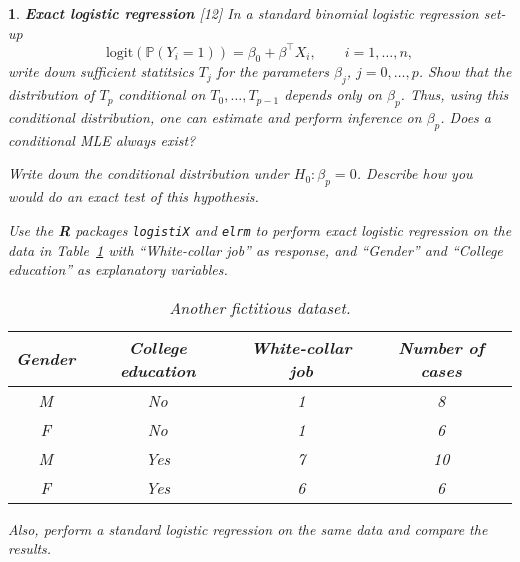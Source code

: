 \documentclass[12pt]{article}
\theoremstyle{problemstyle}
\newtheorem{problem}{}
\newtheorem*{solution*}{Solution}
\begin{document}
\vskip3pt
\begin{problem}
\textbf{Exact logistic regression} \hfill [12]\vskip3pt\noindent
In a standard binomial logistic regression set-up
\[
    \mathrm{logit}(\mathbb{P}(Y_i = 1)) = \beta_0 + \beta^\top X_i, \qquad  i = 1, \ldots, n, 
\]
write down sufficient statitsics $T_j$ for the parameters $\beta_j$, $j = 0, \ldots, p$. Show that the distribution of $T_p$ conditional on $T_0, \ldots, T_{p - 1}$ depends only on $\beta_p$. Thus, using this conditional distribution, one can estimate and perform inference on $\beta_p$. Does a conditional MLE always exist?

Write down the conditional distribution under $H_0: \beta_p = 0$. Describe how you would do an exact test of this hypothesis. 

Use the \textbf{R} packages \texttt{logistiX} and \texttt{elrm} to perform exact logistic regression on the data in Table~\ref{tab:admit} with ``White-collar job'' as response, and ``Gender'' and ``College education'' as explanatory variables.
\begin{table}[!htbp]
    \centering
    \begin{tabular}{cccc}
        Gender & College education & White-collar job & Number  of cases \\ \hline
        M & No & 1 & 8 \\
        F & No & 1 & 6 \\
        M & Yes & 7 & 10 \\
        F & Yes & 6 & 6
    \end{tabular}
    \caption{Another fictitious dataset.}
    \label{tab:admit}
\end{table}
Also, perform a standard logistic regression on the same data and compare the results.
\end{problem}

\end{document}
